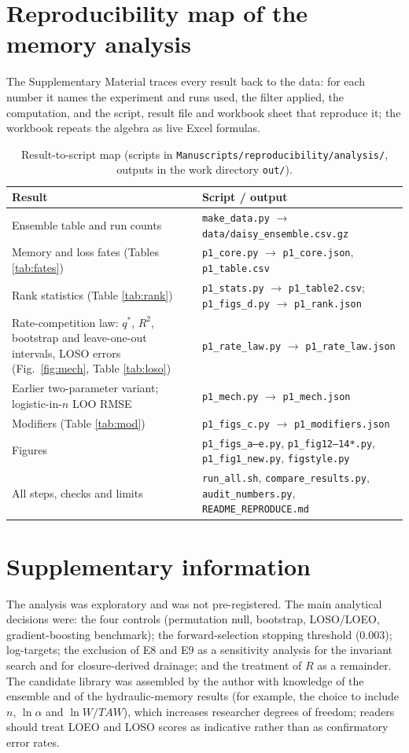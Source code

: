 \documentclass[preprint,12pt,authoryear]{elsarticle}
\newcommand{\TAW}{\mathit{TAW}}
\begin{document}
\section{Reproducibility map of the memory analysis}\label{app:repro}
The Supplementary Material traces every result back to the data: for each number it names the experiment and runs used, the filter applied, the computation, and the script, result file and workbook sheet that reproduce it; the workbook repeats the algebra as live Excel formulas.
\begin{table}[H]\centering\footnotesize
\caption{Result-to-script map (scripts in \texttt{Manuscripts/reproducibility/analysis/}, outputs in the work directory \texttt{out/}).}
\begin{tabularx}{\textwidth}{XX}
\toprule
Result & Script / output\\\midrule
Ensemble table and run counts & \texttt{make\_data.py} $\to$ \texttt{data/daisy\_ensemble.csv.gz}\\
Memory and loss fates (Tables \ref{tab:fates}) & \texttt{p1\_core.py} $\to$ \texttt{p1\_core.json}, \texttt{p1\_table.csv}\\
Rank statistics (Table \ref{tab:rank}) & \texttt{p1\_stats.py} $\to$ \texttt{p1\_table2.csv}; \texttt{p1\_figs\_d.py} $\to$ \texttt{p1\_rank.json}\\
Rate-competition law: $q^\ast$, $R^2$, bootstrap and leave-one-out intervals, LOSO errors (Fig.\ \ref{fig:mech}, Table \ref{tab:loso}) & \texttt{p1\_rate\_law.py} $\to$ \texttt{p1\_rate\_law.json}\\
Earlier two-parameter variant; logistic-in-$n$ LOO RMSE & \texttt{p1\_mech.py} $\to$ \texttt{p1\_mech.json}\\
Modifiers (Table \ref{tab:mod}) & \texttt{p1\_figs\_c.py} $\to$ \texttt{p1\_modifiers.json}\\
Figures & \texttt{p1\_figs\_a--e.py}, \texttt{p1\_fig12--14*.py}, \texttt{p1\_fig1\_new.py}, \texttt{figstyle.py}\\
All steps, checks and limits & \texttt{run\_all.sh}, \texttt{compare\_results.py}, \texttt{audit\_numbers.py}, \texttt{README\_REPRODUCE.md}\\\bottomrule
\end{tabularx}
\end{table}

\section{Supplementary information}
The analysis was exploratory and was not pre-registered. The main analytical decisions were: the four controls (permutation null, bootstrap, LOSO/LOEO, gradient-boosting benchmark); the forward-selection stopping threshold (0.003); log-targets; the exclusion of E8 and E9 as a sensitivity analysis for the invariant search and for closure-derived drainage; and the treatment of $R$ as a remainder. The candidate library was assembled by the author with knowledge of the ensemble and of the hydraulic-memory results (for example, the choice to include $n$, $\ln\alpha$ and $\ln W/\TAW$), which increases researcher degrees of freedom; readers should treat LOEO and LOSO scores as indicative rather than as confirmatory error rates.
\end{document}
